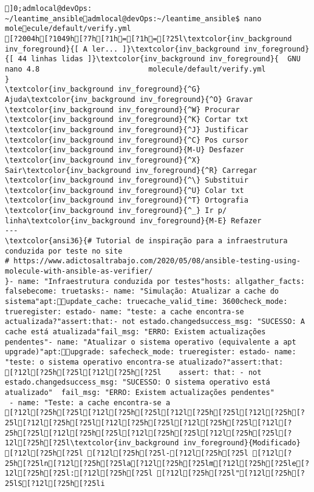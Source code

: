 \documentclass{scrartcl}
\title{}
\begin{document}
\begin{Verbatim}
]0;admlocal@devOps: ~/leantime_ansibleadmlocal@devOps:~/leantime_ansible$ nano moleecule/default/verify.yml 
[?2004h[?1049h[?7h[?1h=[?1h=[?25l\textcolor{inv_background inv_foreground}{[ A ler... ]}\textcolor{inv_background inv_foreground}{[ 44 linhas lidas ]}\textcolor{inv_background inv_foreground}{  GNU nano 4.8                         molecule/default/verify.yml                                      }
\textcolor{inv_background inv_foreground}{^G} Ajuda\textcolor{inv_background inv_foreground}{^O} Gravar     \textcolor{inv_background inv_foreground}{^W} Procurar   \textcolor{inv_background inv_foreground}{^K} Cortar txt \textcolor{inv_background inv_foreground}{^J} Justificar \textcolor{inv_background inv_foreground}{^C} Pos cursor \textcolor{inv_background inv_foreground}{M-U} Desfazer
\textcolor{inv_background inv_foreground}{^X} Sair\textcolor{inv_background inv_foreground}{^R} Carregar   \textcolor{inv_background inv_foreground}{^\} Substituir \textcolor{inv_background inv_foreground}{^U} Colar txt  \textcolor{inv_background inv_foreground}{^T} Ortografia \textcolor{inv_background inv_foreground}{^_} Ir p/ linha\textcolor{inv_background inv_foreground}{M-E} Refazer
---
\textcolor{ansi36}{# Tutorial de inspiração para a infraestrutura conduzida por teste no site
# https://www.adictosaltrabajo.com/2020/05/08/ansible-testing-using-molecule-with-ansible-as-verifier/
}- name: "Infraestrutura conduzida por testes"hosts: allgather_facts: falsebecome: truetasks:- name: "Simulação: Atualizar a cache do sistema"apt:update_cache: truecache_valid_time: 3600check_mode: trueregister: estado- name: "teste: a cache encontra-se actualizada?"assert:that:- not estado.changedsuccess_msg: "SUCESSO: A cache está atualizada"fail_msg: "ERRO: Existem actualizações pendentes"- name: "Atualizar o sistema operativo (equivalente a apt upgrade)"apt:upgrade: safecheck_mode: trueregister: estado- name: "teste: o sistema operativo encontra-se atualizado?"assert:that:
[?12l[?25h[?25l[?12l[?25h[?25l    assert: that: - not estado.changedsuccess_msg: "SUCESSO: O sistema operativo está atualizado"  fail_msg: "ERRO: Existem actualizações pendentes"
 - name: "Teste: a cache encontra-se a
[?12l[?25h[?25l[?12l[?25h[?25l[?12l[?25h[?25l[?12l[?25h[?25l[?12l[?25h[?25l[?12l[?25h[?25l[?12l[?25h[?25l[?12l[?25h[?25l[?12l[?25h[?25l[?12l[?25h[?25l[?12l[?25h[?25l[?12l[?25h[?25l\textcolor{inv_background inv_foreground}{Modificado}
[?12l[?25h[?25l [?12l[?25h[?25l-[?12l[?25h[?25l [?12l[?25h[?25ln[?12l[?25h[?25la[?12l[?25h[?25lm[?12l[?25h[?25le[?12l[?25h[?25l:[?12l[?25h[?25l [?12l[?25h[?25l"[?12l[?25h[?25lS[?12l[?25h[?25li

\end{Verbatim}
\end{document}
